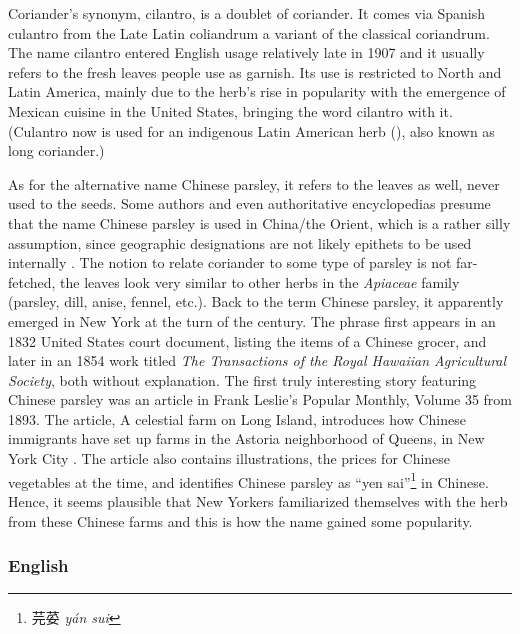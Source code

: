Coriander’s synonym, cilantro, is a doublet of coriander. It comes via Spanish culantro from the Late Latin coliandrum a variant of the classical coriandrum. The name cilantro entered English usage relatively late in 1907 \parencite{harper_coriander_nodate} and it usually refers to the fresh leaves people use as garnish. Its use is restricted to North and Latin America, mainly due to the herb’s rise in popularity with the emergence of Mexican cuisine in the United States, bringing the word cilantro with it. (Culantro now is used for an indigenous Latin American herb (), also known as long coriander.)

As for the alternative name Chinese parsley, it refers to the leaves as well, never used to the seeds. Some authors and even authoritative encyclopedias presume that the name Chinese parsley is used in China/the Orient, which is a rather silly assumption, since geographic designations are not likely epithets to be used internally \parencite[cf.][]{davidson_oxford_2014, oconnell_book_2016}. The notion to relate coriander to some type of parsley is not far-fetched, the leaves look very similar to other herbs in the \textit{Apiaceae} family (parsley, dill, anise, fennel, etc.). Back to the term Chinese parsley, it apparently emerged in New York at the turn of the century. The phrase first appears in an 1832 United States court document, listing the items of a Chinese grocer, and later in an 1854 work titled \textit{The Transactions of the Royal Hawaiian Agricultural Society}, both without explanation. The first truly interesting story featuring Chinese parsley was an article in Frank Leslie's Popular Monthly, Volume 35 from 1893. The article, A celestial farm on Long Island, introduces how Chinese immigrants have set up farms in the Astoria neighborhood of Queens, in New York City \parencite{seitz_celestial_1893} . The article also contains illustrations, the prices for Chinese vegetables at the time, and identifies Chinese parsley as ``yen sai''\footnote{芫荽 \textit{yán sui}} in Chinese. Hence, it seems plausible that New Yorkers familiarized themselves with the herb from these Chinese farms and this is how the name gained some popularity.



\subsubsection{English}



